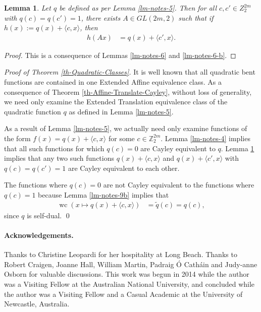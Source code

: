 \documentclass[12pt,a4paper]{article}
\newcommand{\mb}[1]{\mathbb{#1}}
\newcommand{\Z}{\mb{Z}}
\newcommand{\dual}[1]{\widetilde{#1}}
\newcommand{\weightclass}[1]{\operatorname{wc}\left(#1\right)}
\newtheorem{Lemma}{Lemma}
\newenvironment{proofof}[1]{\noindent\emph{Proof of #1.}}{\qed}
\begin{document}
\begin{Lemma}
\label{lm-notes-7}
Let $q$ be defined as per Lemma \ref{lm-notes-5}.
Then for all $c, c' \in Z_2^{2 m}$ with $q(c)=q(c')=1$, there exists $A \in GL(2 m, 2)$ such that
if $h(x) := q(x) + \langle c, x \rangle$, then
\begin{align*}
h(A x) &= q(x) + \langle c', x \rangle.
\end{align*}
\end{Lemma}

\begin{proof}
This is a consequence of Lemmas \ref{lm-notes-6} and \ref{lm-notes-6-b}.
\end{proof}

\begin{proofof}{Theorem \ref{th-Quadratic-Classes}}
It is well known that all quadratic bent functions are contained in one Extended Affine equivalence
class.
As a consequence of Theorem \ref{th-Affine-Translate-Cayley}, without loss of generality, we need
only examine
the Extended Translation equivalence class of the quadratic function $q$ as defined in Lemma
\ref{lm-notes-5}.

As a result of Lemma \ref{lm-notes-5}, we actually need only examine functions of the form
$f(x) = q(x) + \langle c,x \rangle$
for some $c \in \Z_2^{2m}$.
Lemma \ref{lm-notes-4} implies that all such functions for which $q(c)=0$ are Cayley equivalent to
$q$.
Lemma \ref{lm-notes-7} implies that any two such functions $q(x) + \langle c, x \rangle$ and $q(x) +
\langle c', x \rangle$
with $q(c)=q(c')=1$ are Cayley equivalent to each other.

The functions where $q(c)=0$ are not Cayley equivalent to the functions where $q(c)=1$ because
Lemma \ref{lm-notes-9b} implies that
\begin{align*}
\weightclass{x \mapsto q(x) + \langle c,x \rangle}
&=
\dual{q}(c) = q(c),
\end{align*}
since $q$ is self-dual.
\end{proofof}

\paragraph*{Acknowledgements.}

Thanks to Christine Leopardi for her hospitality at Long Beach.
Thanks to Robert Craigen, Joanne Hall, William Martin,
Padraig {\'O} Cath{\'a}in and Judy-anne Osborn for valuable discussions.
This work was begun in 2014 while the author was a Visiting Fellow at the Australian National University,
and concluded while the author was a Visiting Fellow and a Casual Academic at the University of Newcastle, Australia.








%
\end{document}

